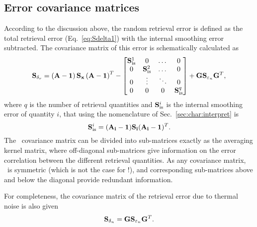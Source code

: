 \subsection{Error covariance matrices}
\label{sec:Sreterr}
%
According to the discussion above, the random retrieval error is defined as the
total retrieval error (Eq.~\ref{eq:Sdelta1}) with the internal smoothing error
subtracted. The covariance matrix of this error is schematically calculated as
\begin{equation}
  \label{eq:Sdeltar}
  \mathbf{S}_{\delta_r} = \left(\mathbf{A}-\mathbf{1}\right)\mathbf{S}_{\mathbf{x}}
  \left(\mathbf{A}-\mathbf{1}\right)^T -
  \begin{bmatrix}
  \mathbf{S}_\mathrm{is}^1 & 0 & \dots & 0 \\
  0 & \mathbf{S}_\mathrm{is}^2 & \dots & 0 \\
  0 & \vdots & \ddots & 0 \\
  0 & 0 & 0 &  \mathbf{S}_\mathrm{is}^q
  \end{bmatrix} 
  + \mathbf{G}\mathbf{S}_{\varepsilon_n}\mathbf{G}^T,
\end{equation}
where $q$ is the number of retrieval quantities and $\mathbf{S}_\mathrm{is}^i$ is
the internal smoothing error of quantity $i$, that using the nomenclature of
Sec.~\ref{sec:char:interpret} is
\begin{displaymath}
  \mathbf{S}_\mathrm{is}^i = (\mathbf{A}_{\mathbf{i}}-\mathbf{1})\mathbf{S}_{\mathbf{i}}
(\mathbf{A}_{\mathbf{i}}-\mathbf{1})^T.
\end{displaymath}
The \ covariance matrix can be divided into sub-matrices
exactly as the averaging kernel matrix, where off-diagonal sub-matrices give
information on the error correlation between the different retrieval
quantities. As any covariance matrix, \ is symmetric (which
is not the case for \AvrKrnMtr!), and corresponding sub-matrices above and
below the diagonal provide redundant information.

For completeness, the covariance matrix of the retrieval error due to thermal
noise is also given
\begin{equation}
  \label{eq:Sdeltan}
  \mathbf{S}_{\delta_n} = \mathbf{G}\mathbf{S}_{\varepsilon_n}\mathbf{G}^T.
\end{equation}
\\


